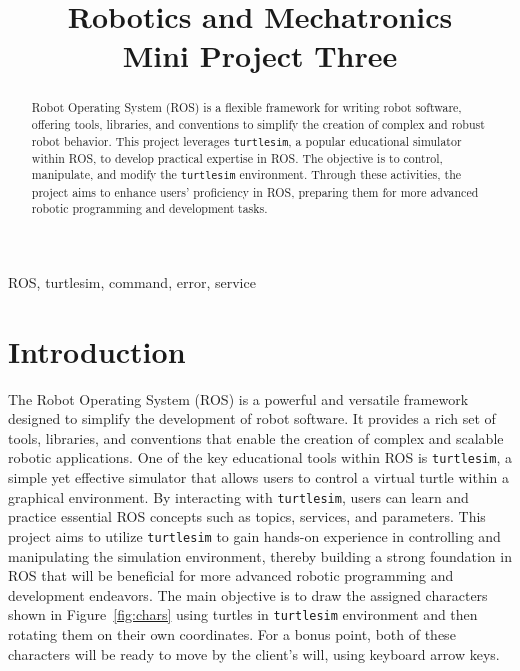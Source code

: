 \documentclass[conference]{IEEEtran}
\title{Robotics and Mechatronics\\
{\LARGE Mini Project Three}
}
\author{\IEEEauthorblockN{Mohammad Montazeri}
    \IEEEauthorblockA{\textit{School of Mechanical Engineering} \\
        \textit{College of Engineering, University of Tehran}\\
        Tehran, Iran; 810699269 \\
        mohammadmontazeri@ut.ac.ir}
}
\begin{document}
\maketitle

\begin{abstract}
    Robot Operating System (ROS) is a flexible framework for writing robot software, offering tools, libraries, and conventions to simplify the creation of complex and robust robot behavior. This project leverages \texttt{turtlesim}, a popular educational simulator within ROS, to develop practical expertise in ROS. The objective is to control, manipulate, and modify the \texttt{turtlesim} environment. Through these activities, the project aims to enhance users' proficiency in ROS, preparing them for more advanced robotic programming and development tasks.
\end{abstract}

\begin{IEEEkeywords}
    ROS, turtlesim, command, error, service
\end{IEEEkeywords}

\section{Introduction}
The Robot Operating System (ROS) is a powerful and versatile framework designed to simplify the development of robot software. It provides a rich set of tools, libraries, and conventions that enable the creation of complex and scalable robotic applications. One of the key educational tools within ROS is \texttt{turtlesim}, a simple yet effective simulator that allows users to control a virtual turtle within a graphical environment. By interacting with \texttt{turtlesim}, users can learn and practice essential ROS concepts such as topics, services, and parameters. This project aims to utilize \texttt{turtlesim} to gain hands-on experience in controlling and manipulating the simulation environment, thereby building a strong foundation in ROS that will be beneficial for more advanced robotic programming and development endeavors. The main objective is to draw the assigned characters shown in Figure~\ref{fig:chars} using turtles in \texttt{turtlesim} environment and then rotating them on their own coordinates. For a bonus point, both of these characters will be ready to move by the client's will, using keyboard arrow keys.
\end{document}
